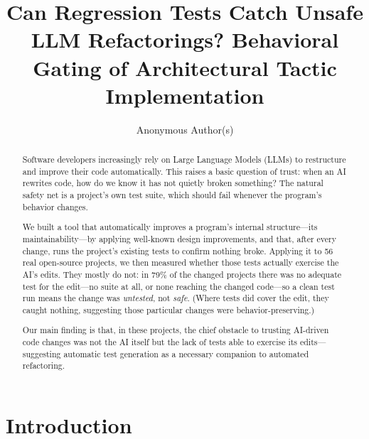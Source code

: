 \documentclass[runningheads]{llncs}
\begin{document}
\title{Can Regression Tests Catch Unsafe LLM Refactorings? Behavioral Gating of Architectural Tactic Implementation}

\author{Anonymous Author(s)}

\maketitle

\begin{abstract}

Software developers increasingly rely on Large Language Models (LLMs) to restructure and improve their code automatically. This raises a basic question of trust: when an AI rewrites code, how do we know it has not quietly broken something? The natural safety net is a project's own test suite, which should fail whenever the program's behavior changes.

We built a tool that automatically improves a program's internal structure---its maintainability---by applying well-known design improvements, and that, after every change, runs the project's existing tests to confirm nothing broke. Applying it to 56 real open-source projects, we then measured whether those tests actually exercise the AI's edits. They mostly do not: in 79\% of the changed projects there was no adequate test for the edit---no suite at all, or none reaching the changed code---so a clean test run means the change was \emph{untested}, not \emph{safe}. (Where tests did cover the edit, they caught nothing, suggesting those particular changes were behavior-preserving.)

Our main finding is that, in these projects, the chief obstacle to trusting AI-driven code changes was not the AI itself but the lack of tests able to exercise its edits---suggesting automatic test generation as a necessary companion to automated refactoring.


\end{abstract}

\section{Introduction}
\end{document}
